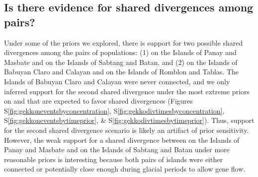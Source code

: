 \subsection{Is there evidence for shared divergences among  pairs?}

Under some of the priors we explored, there is support for two possible shared
divergences among the pairs of  populations:
(1)
 on the Islands of Panay and Masbate
and
 on the Islands of Sabtang and Batan,
and (2)
 on the Islands of Babuyan Claro and Calayan
and
 on the Islands of Romblon and Tablas.
The Islands of Babuyan Claro and Calayan were never connected,
and we only inferred support for the second shared divergence
under the most extreme priors on \concentration and
\divtime that are expected to favor shared divergences
(Figures
S\ref{fig:gekkoneventsbyconcentration},
S\ref{fig:gekkodivtimesbyconcentration},
S\ref{fig:gekkoneventsbytimeprior},
\&
S\ref{fig:gekkodivtimesbytimeprior}).
Thus, support for the second shared divergence scenario is likely an
artifact of prior sensitivity.
However, the weak support for a shared divergence between
 on the Islands of Panay and Masbate
and
 on the Islands of Sabtang and Batan
under more reasonable priors is interesting because both pairs of islands were
either connected or potentially close enough during glacial periods to allow
gene flow.

